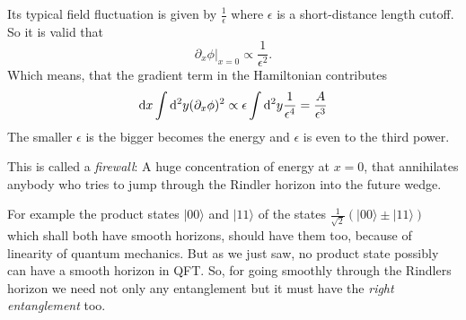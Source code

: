 	Its typical field fluctuation is given by $\frac{1}{\epsilon}$ where $\epsilon$ is a short-distance length cutoff.  So it is valid that
		\begin{equation}
			\partial_x \phi|_{x=0} \propto \frac{1}{\epsilon^2}.
		\end{equation}
	Which means, that the gradient term in the Hamiltonian contributes
		\begin{equation}
			\mathrm{d} x \int \mathrm{d}^2 y (\partial_x\phi)^2 \propto 
			\epsilon \int \mathrm{d}^2 y \frac{1}{\epsilon^4} 
			= \frac{A}{\epsilon^3}
		\end{equation}	
	The smaller $\epsilon$ is the bigger becomes the energy and $\epsilon$ is even to the third power.
	 			
	This is called a \textit{firewall}: A huge concentration of energy at $x=0$, that annihilates anybody who tries to jump through the Rindler horizon into the future wedge.
	
	For example the product states $|00\rangle$ and $|11\rangle$ of the states $\frac{1}{\sqrt{2}}
	(|00\rangle \pm |11\rangle)$ which shall both have smooth horizons, should have them too, because of linearity of quantum mechanics. But as we just saw, no product state possibly can have a smooth horizon in QFT. So, for going smoothly through the Rindlers horizon we need not only any entanglement but it must have the \textit{right entanglement} too.